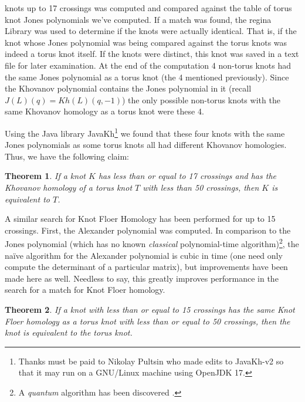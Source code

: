 \documentclass{article}
\theoremstyle{plain}
\newtheorem{theorem}{Theorem}
\begin{document}
        knots up to 17 crossings was computed and compared against the table of
        torus knot Jones polynomials we've computed. If a match was found,
        the regina Library was used to determine if the knots were actually
        identical. That is, if the knot whose Jones polynomial was being
        compared against the torus knots was indeed a torus knot itself. If the
        knots were distinct, this knot was saved in a text file for later
        examination. At the end of the computation 4 non-torus knots had the
        same Jones polynomial as a torus knot (the 4 mentioned previously).
        Since the Khovanov polynomial contains the Jones polynomial in it
        (recall $J(L)(q)=Kh(L)(q,-1)$) the only possible non-torus knots with
        the same Khovanov homology as a torus knot were these 4.
        \par\hfill\par
        Using the Java library JavaKh\footnote{%
            Thanks must be paid to Nikolay Pultsin who made edits to
            JavaKh-v2 so that it may run on a GNU/Linux machine using
            OpenJDK 17.
        }
        we found that these four knots with the same Jones polynomials as some
        torus knots all had different Khovanov homologies. Thus, we have the
        following claim:
        \begin{theorem}
            If a knot $K$ has less than or equal to 17 crossings and has the
            Khovanov homology of a torus knot $T$ with less than 50 crossings,
            then $K$ is equivalent to $T$.
        \end{theorem}
        A similar search for Knot Floer Homology has been performed for up to 15
        crossings. First, the Alexander polynomial was computed.
        In comparison to the Jones polynomial (which has no known
        \textit{classical} polynomial-time algorithm)\footnote{%
            A \textit{quantum} algorithm has been discovered
            \cite{JonesQuantumAlgorithm}.
        }, the na\"{i}ve algorithm for the Alexander polynomial is cubic in
        time (one need only compute the determinant of a particular matrix), but
        improvements have been made here as well. Needless to say, this greatly
        improves performance in the search for a match for Knot Floer homology.
        \begin{theorem}
            If a knot with less than or equal to 15 crossings has the same
            Knot Floer homology as a torus knot with less than or equal to 50
            crossings, then the knot is equivalent to the torus knot.
        \end{theorem}
\end{document}
